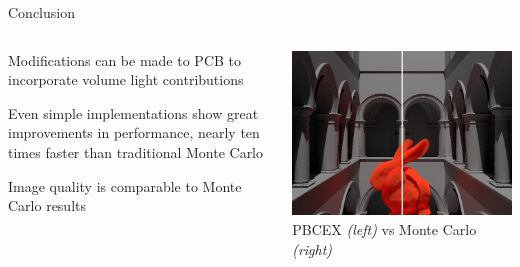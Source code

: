 \documentclass[10pt,compress,professionalfont]{beamer}
\begin{document}
\begin{frame}{Conclusion}

    \begin{columns}
        \begin{column}{0.5\textwidth}

            Modifications can be made to PCB to incorporate volume light contributions\\
            \vspace{8mm}

            Even simple implementations show great improvements in performance, nearly ten times faster than traditional Monte Carlo\\
            \vspace{8mm}

            Image quality is comparable to Monte Carlo results

        \end{column}
        \begin{column}{0.5\textwidth}
            \includegraphics[width=\textwidth]{../img/compare}\\
            {\centering\scriptsize PBCEX \textit{(left)} vs Monte Carlo \textit{(right)} \\}
        \end{column}
    \end{columns}

\end{frame}
\end{document}
